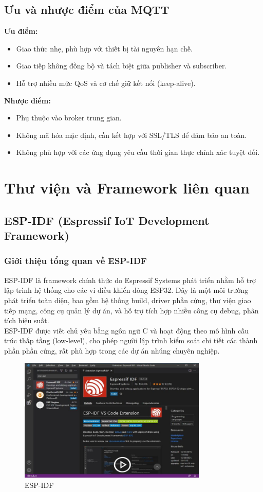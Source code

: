\subsection{Ưu và nhược điểm của MQTT}
\textbf{Ưu điểm:}
\begin{itemize}
    \item Giao thức nhẹ, phù hợp với thiết bị tài nguyên hạn chế.
    \item Giao tiếp không đồng bộ và tách biệt giữa publisher và subscriber.
    \item Hỗ trợ nhiều mức QoS và cơ chế giữ kết nối (keep-alive).
\end{itemize}
\textbf{Nhược điểm:}
\begin{itemize}
    \item Phụ thuộc vào broker trung gian.
    \item Không mã hóa mặc định, cần kết hợp với SSL/TLS để đảm bảo an toàn.
    \item Không phù hợp với các ứng dụng yêu cầu thời gian thực chính xác tuyệt đối.
\end{itemize}
\section{Thư viện và Framework liên quan}
\subsection{ESP-IDF (Espressif IoT Development Framework)}
\subsubsection{Giới thiệu tổng quan về ESP-IDF}
ESP-IDF là framework chính thức do Espressif Systems phát triển nhằm hỗ trợ lập trình hệ thống cho các vi điều khiển dòng ESP32. Đây là một môi trường phát triển toàn diện, bao gồm hệ thống build, driver phần cứng, thư viện giao tiếp mạng, công cụ quản lý dự án, và hỗ trợ tích hợp nhiều công cụ debug, phân tích hiệu suất.\\
ESP-IDF được viết chủ yếu bằng ngôn ngữ C và hoạt động theo mô hình cấu trúc thấp tầng (low-level), cho phép người lập trình kiểm soát chi tiết các thành phần phần cứng, rất phù hợp trong các dự án nhúng chuyên nghiệp.
\begin{figure}[H]
  \centering
  \includegraphics[width=0.8\textwidth]{Images/ESP-IDF.png}
  \caption{ESP-IDF}
\end{figure}
